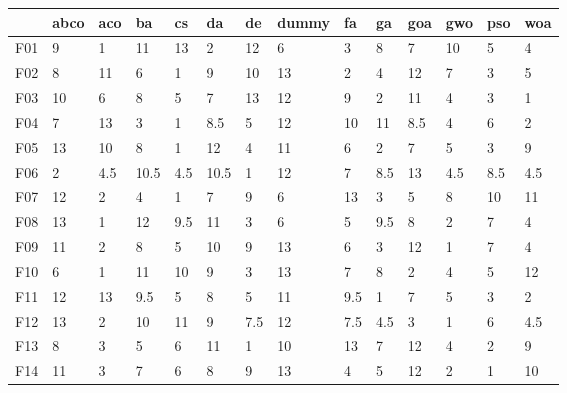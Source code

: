 \begin{table}
    \begin{adjustbox}{width=\linewidth}
        \begin{tabular}{llllllllllllll}
            \toprule
            {}   & abco  & aco   & ba    & cs    & da    & de    & dummy  & fa    & ga    & goa   & gwo   & pso   & woa   \\
            \midrule
            F01  & 9     & 1     & 11    & 13    & 2     & 12    & 6      & 3     & 8     & 7     & 10    & 5     & 4     \\
            F02  & 8     & 11    & 6     & 1     & 9     & 10    & 13     & 2     & 4     & 12    & 7     & 3     & 5     \\
            F03  & 10    & 6     & 8     & 5     & 7     & 13    & 12     & 9     & 2     & 11    & 4     & 3     & 1     \\
            F04  & 7     & 13    & 3     & 1     & 8.5   & 5     & 12     & 10    & 11    & 8.5   & 4     & 6     & 2     \\
            F05  & 13    & 10    & 8     & 1     & 12    & 4     & 11     & 6     & 2     & 7     & 5     & 3     & 9     \\
            F06  & 2     & 4.5   & 10.5  & 4.5   & 10.5  & 1     & 12     & 7     & 8.5   & 13    & 4.5   & 8.5   & 4.5   \\
            F07  & 12    & 2     & 4     & 1     & 7     & 9     & 6      & 13    & 3     & 5     & 8     & 10    & 11    \\
            F08  & 13    & 1     & 12    & 9.5   & 11    & 3     & 6      & 5     & 9.5   & 8     & 2     & 7     & 4     \\
            F09  & 11    & 2     & 8     & 5     & 10    & 9     & 13     & 6     & 3     & 12    & 1     & 7     & 4     \\
            F10  & 6     & 1     & 11    & 10    & 9     & 3     & 13     & 7     & 8     & 2     & 4     & 5     & 12    \\
            F11  & 12    & 13    & 9.5   & 5     & 8     & 5     & 11     & 9.5   & 1     & 7     & 5     & 3     & 2     \\
            F12  & 13    & 2     & 10    & 11    & 9     & 7.5   & 12     & 7.5   & 4.5   & 3     & 1     & 6     & 4.5   \\
            F13  & 8     & 3     & 5     & 6     & 11    & 1     & 10     & 13    & 7     & 12    & 4     & 2     & 9     \\
            F14  & 11    & 3     & 7     & 6     & 8     & 9     & 13     & 4     & 5     & 12    & 2     & 1     & 10    \\

\end{tabular}
\end{adjustbox}
\end{table}
